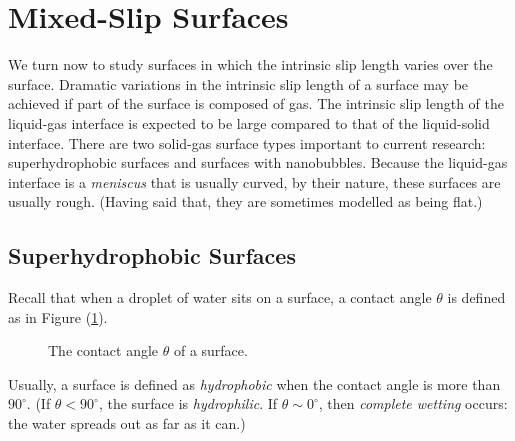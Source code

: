 \documentclass[12pt, a4paper, twoside, openright]{book}
\begin{document}
\clearpage
\section{Mixed-Slip Surfaces}

We turn now to study surfaces in which the intrinsic slip length varies over the surface.
Dramatic variations in the intrinsic slip length of a surface may be achieved if part of the surface is composed of gas.  The intrinsic slip length of the liquid-gas interface is expected to be large compared to that of the liquid-solid interface.  There are two solid-gas surface types important to current research: superhydrophobic surfaces and surfaces with nanobubbles.
Because the liquid-gas interface is a \emph{meniscus} that is usually curved, by their nature, these surfaces are usually rough.  (Having said that, they are sometimes modelled as being flat.)

\subsection{Superhydrophobic Surfaces}

Recall that when a droplet of water sits on a surface, a contact angle $\theta$ is defined as in Figure (\ref{contactangle}).

\begin{figure}[ht]
\centering
{}
\caption{The contact angle $\theta$ of a surface.}\label{contactangle}
\end{figure}

Usually, a surface is defined as \emph{hydrophobic} when the contact angle is more than $90^{\circ}$.
(If $\theta < 90^{\circ}$, the surface is \emph{hydrophilic}.  If $\theta \sim 0^{\circ}$, then \emph{complete wetting} occurs: the water spreads out as far as it can.)
\end{document}
